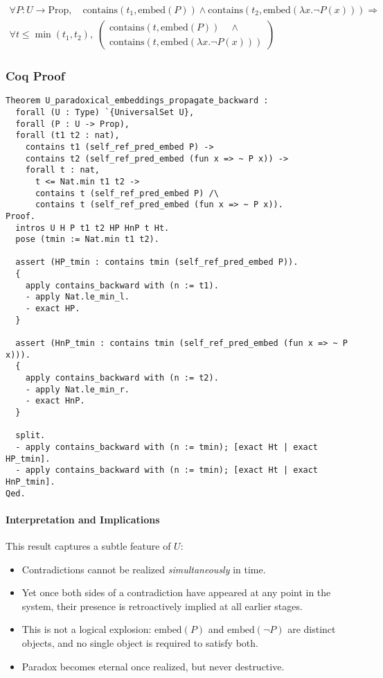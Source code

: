 \documentclass[12pt]{article}
\begin{document}
\begin{align}
\forall P: U \to \text{Prop},\quad
\text{contains}(t_1, \text{embed}(P)) \wedge \text{contains}(t_2, \text{embed}(\lambda x. \neg P(x))) 
\Rightarrow \\
\forall t \leq \min(t_1, t_2),\;
\left(
\begin{array}{l}
\text{contains}(t, \text{embed}(P)) \quad \wedge \\
\text{contains}(t, \text{embed}(\lambda x. \neg P(x)))
\end{array}
\right)
\end{align}

\subsubsection{Coq Proof}
\begin{lstlisting}[language=Coq]
Theorem U_paradoxical_embeddings_propagate_backward :
  forall (U : Type) `{UniversalSet U},
  forall (P : U -> Prop),
  forall (t1 t2 : nat),
    contains t1 (self_ref_pred_embed P) ->
    contains t2 (self_ref_pred_embed (fun x => ~ P x)) ->
    forall t : nat,
      t <= Nat.min t1 t2 ->
      contains t (self_ref_pred_embed P) /\
      contains t (self_ref_pred_embed (fun x => ~ P x)).
Proof.
  intros U H P t1 t2 HP HnP t Ht.
  pose (tmin := Nat.min t1 t2).

  assert (HP_tmin : contains tmin (self_ref_pred_embed P)).
  {
    apply contains_backward with (n := t1).
    - apply Nat.le_min_l.
    - exact HP.
  }

  assert (HnP_tmin : contains tmin (self_ref_pred_embed (fun x => ~ P x))).
  {
    apply contains_backward with (n := t2).
    - apply Nat.le_min_r.
    - exact HnP.
  }

  split.
  - apply contains_backward with (n := tmin); [exact Ht | exact HP_tmin].
  - apply contains_backward with (n := tmin); [exact Ht | exact HnP_tmin].
Qed.
\end{lstlisting}

\paragraph{Interpretation and Implications}

This result captures a subtle feature of \( U \):

\begin{itemize}
    \item Contradictions cannot be realized \textit{simultaneously} in time.
    \item Yet once both sides of a contradiction have appeared at any point in the system, their presence is retroactively implied at all earlier stages.
    \item This is not a logical explosion: \( \text{embed}(P) \) and \( \text{embed}(\neg P) \) are distinct objects, and no single object is required to satisfy both.
    \item Paradox becomes eternal once realized, but never destructive.
\end{itemize}
\end{document}
